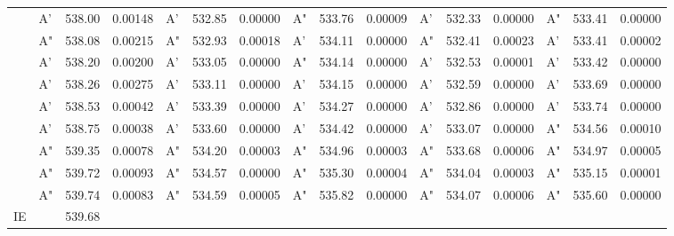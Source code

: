 \documentclass[journal=jctcce,manuscript=article]{achemso}
\begin{document}
\begin{table}
\begin{tabular}{l|lcc|lcc|lcc|lcc|lcc}
 &  A'  &  538.00  &  0.00148 & A' & 532.85 & 0.00000 & A" & 533.76 & 0.00009 & A' & 532.33 & 0.00000 & A" & 533.41 & 0.00000 \\ 
 &  A"  &  538.08  &  0.00215 & A" & 532.93 & 0.00018 & A' & 534.11 & 0.00000 & A" & 532.41 & 0.00023 & A' & 533.41 & 0.00002 \\ 
 &  A'  &  538.20  &  0.00200 & A' & 533.05 & 0.00000 & A" & 534.14 & 0.00000 & A' & 532.53 & 0.00001 & A' & 533.42 & 0.00000 \\ 
 &  A'  &  538.26  &  0.00275 & A' & 533.11 & 0.00000 & A' & 534.15 & 0.00000 & A' & 532.59 & 0.00000 & A' & 533.69 & 0.00000 \\ 
 &  A'  &  538.53  &  0.00042 & A' & 533.39 & 0.00000 & A' & 534.27 & 0.00000 & A' & 532.86 & 0.00000 & A' & 533.74 & 0.00000 \\ 
 &  A'  &  538.75  &  0.00038 & A' & 533.60 & 0.00000 & A' & 534.42 & 0.00000 & A' & 533.07 & 0.00000 & A" & 534.56 & 0.00010 \\ 
 &  A"  &  539.35  &  0.00078 & A" & 534.20 & 0.00003 & A" & 534.96 & 0.00003 & A" & 533.68 & 0.00006 & A" & 534.97 & 0.00005 \\ 
 &  A"  &  539.72  &  0.00093 & A" & 534.57 & 0.00000 & A" & 535.30 & 0.00004 & A" & 534.04 & 0.00003 & A" & 535.15 & 0.00001 \\ 
 &  A"  &  539.74  &  0.00083 & A" & 534.59 & 0.00005 & A" & 535.82 & 0.00000 & A" & 534.07 & 0.00006 & A" & 535.60 & 0.00000 \\ 

\hline
IE & & 539.68 \\
\hline
  \end{tabular}
\end{table}
\end{document}
